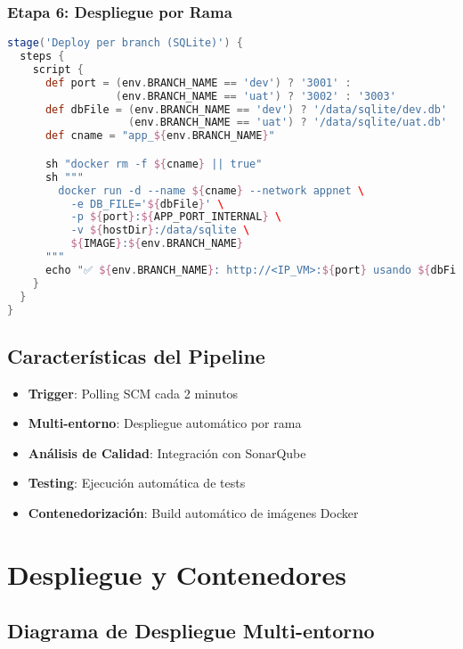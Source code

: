 \documentclass[12pt,a4paper]{article}
\begin{document}
\subsubsection{Etapa 6: Despliegue por Rama}
\begin{lstlisting}[language=groovy]
stage('Deploy per branch (SQLite)') {
  steps {
    script {
      def port = (env.BRANCH_NAME == 'dev') ? '3001' :
                 (env.BRANCH_NAME == 'uat') ? '3002' : '3003'
      def dbFile = (env.BRANCH_NAME == 'dev') ? '/data/sqlite/dev.db' :
                   (env.BRANCH_NAME == 'uat') ? '/data/sqlite/uat.db' : '/data/sqlite/prod.db'
      def cname = "app_${env.BRANCH_NAME}"

      sh "docker rm -f ${cname} || true"
      sh """
        docker run -d --name ${cname} --network appnet \
          -e DB_FILE='${dbFile}' \
          -p ${port}:${APP_PORT_INTERNAL} \
          -v ${hostDir}:/data/sqlite \
          ${IMAGE}:${env.BRANCH_NAME}
      """
      echo "✅ ${env.BRANCH_NAME}: http://<IP_VM>:${port} usando ${dbFile}"
    }
  }
}
\end{lstlisting}

\subsection{Características del Pipeline}

\begin{itemize}
    \item \textbf{Trigger}: Polling SCM cada 2 minutos
    \item \textbf{Multi-entorno}: Despliegue automático por rama
    \item \textbf{Análisis de Calidad}: Integración con SonarQube
    \item \textbf{Testing}: Ejecución automática de tests
    \item \textbf{Contenedorización}: Build automático de imágenes Docker
\end{itemize}

\section{Despliegue y Contenedores}

\subsection{Diagrama de Despliegue Multi-entorno}
\end{document}
